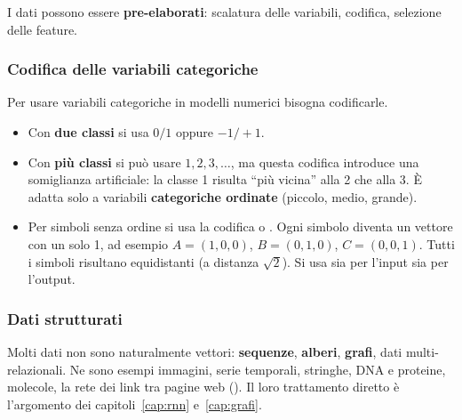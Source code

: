 I dati possono essere \textbf{pre-elaborati}: scalatura delle variabili, codifica, selezione delle feature.

\subsubsection{Codifica delle variabili categoriche}
Per usare variabili categoriche in modelli numerici bisogna codificarle.
\begin{itemize}
  \item Con \textbf{due classi} si usa $0/1$ oppure $-1/+1$.
  \item Con \textbf{più classi} si può usare $1,2,3,\dots$, ma questa codifica introduce una somiglianza
        artificiale: la classe 1 risulta ``più vicina'' alla 2 che alla 3. È adatta solo a variabili
        \textbf{categoriche ordinate} (piccolo, medio, grande).
  \item Per simboli senza ordine si usa la codifica  o . Ogni simbolo diventa
        un vettore con un solo 1, ad esempio $A=(1,0,0)$, $B=(0,1,0)$, $C=(0,0,1)$. Tutti i simboli risultano
        equidistanti (a distanza $\sqrt2$). Si usa sia per l'input sia per l'output.
\end{itemize}

\subsubsection{Dati strutturati}
Molti dati non sono naturalmente vettori: \textbf{sequenze}, \textbf{alberi}, \textbf{grafi}, dati
multi-relazionali. Ne sono esempi immagini, serie temporali, stringhe, DNA e proteine, molecole, la rete dei link
tra pagine web (). Il loro trattamento diretto è l'argomento dei
capitoli~\ref{cap:rnn} e~\ref{cap:grafi}.

